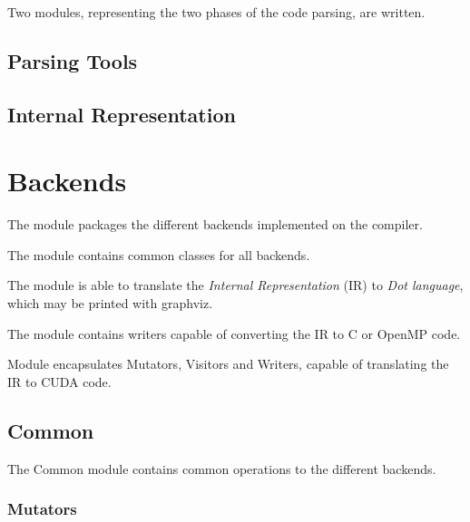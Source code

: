 \documentclass[a4paper,10pt,english]{manual}
\begin{document}
Two modules, representing the two phases of the code parsing, are written.


\section{Parsing Tools}


\section{Internal Representation}

\resetcurrentobjects
\hypertarget{--doc-backends}{}

\chapter{Backends}
\hypertarget{module-Backends}{}
The \hyperlink{module-Backends}{} module packages the different backends implemented on the compiler.

The \hyperlink{module-Common}{} module contains common classes for all backends.

The \hyperlink{module-DotBackend}{} module is able to translate the \emph{Internal
Representation} (IR) to \emph{Dot language}, which may be printed with
graphviz.

The \hyperlink{module-CBackend}{} module contains writers capable of converting the IR to
C or OpenMP code.

Module \hyperlink{module-CudaBackend}{} encapsulates Mutators, Visitors and Writers, capable of
translating the IR to CUDA code.

\resetcurrentobjects
\hypertarget{--doc-common}{}

\section{Common}
\hypertarget{module-Common}{}
The Common module contains common operations to the different backends.


\subsection{Mutators}
\end{document}
